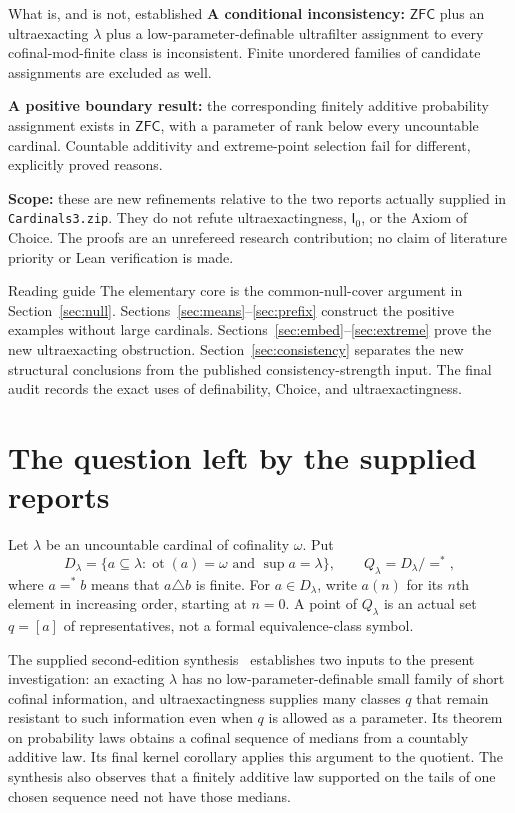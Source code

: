 \documentclass[11pt,letterpaper]{article}
\theoremstyle{definition}
\newcommand{\ZFC}{\mathsf{ZFC}}
\newcommand{\ot}{\operatorname{ot}}
\newcommand{\Izero}{\mathsf I_0}
\newcommand{\Dlam}{D_\lambda}
\newcommand{\Qlam}{Q_\lambda}
\begin{document}
\begin{assessment}{What is, and is not, established}
\textbf{A conditional inconsistency:} $\ZFC$ plus an ultraexacting $\lambda$ plus a low-parameter-definable ultrafilter assignment to every cofinal-mod-finite class is inconsistent. Finite unordered families of candidate assignments are excluded as well.

\textbf{A positive boundary result:} the corresponding finitely additive probability assignment exists in $\ZFC$, with a parameter of rank below every uncountable cardinal. Countable additivity and extreme-point selection fail for different, explicitly proved reasons.

\textbf{Scope:} these are new refinements relative to the two reports actually supplied in \nolinkurl{Cardinals3.zip}. They do not refute ultraexactingness, $\Izero$, or the Axiom of Choice. The proofs are an unrefereed research contribution; no claim of literature priority or Lean verification is made.
\end{assessment}

\newpage
\tableofcontents
\vspace{10pt}
\begin{assessment}{Reading guide}
The elementary core is the common-null-cover argument in Section~\ref{sec:null}. Sections~\ref{sec:means}--\ref{sec:prefix} construct the positive examples without large cardinals. Sections~\ref{sec:embed}--\ref{sec:extreme} prove the new ultraexacting obstruction. Section~\ref{sec:consistency} separates the new structural conclusions from the published consistency-strength input. The final audit records the exact uses of definability, Choice, and ultraexactingness.
\end{assessment}

\section{The question left by the supplied reports}\label{sec:intro}

Let $\lambda$ be an uncountable cardinal of cofinality $\omega$. Put
\[
 \Dlam=\{a\subseteq\lambda:\ot(a)=\omega\text{ and }\sup a=\lambda\},
 \qquad \Qlam=\Dlam/{=^*},
\]
where $a=^*b$ means that $a\triangle b$ is finite. For $a\in\Dlam$, write $a(n)$ for its $n$th element in increasing order, starting at $n=0$. A point of $\Qlam$ is an actual set $q=[a]$ of representatives, not a formal equivalence-class symbol.

The supplied second-edition synthesis~\cite{archive} establishes two inputs to the present investigation: an exacting $\lambda$ has no low-parameter-definable small family of short cofinal information, and ultraexactingness supplies many classes $q$ that remain resistant to such information even when $q$ is allowed as a parameter. Its theorem on probability laws obtains a cofinal sequence of medians from a countably additive law. Its final kernel corollary applies this argument to the quotient. The synthesis also observes that a finitely additive law supported on the tails of one chosen sequence need not have those medians.
\end{document}
